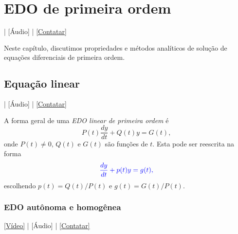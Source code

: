 

\chapter{EDO de primeira ordem}\label{cap_edo1ordem}
\thispagestyle{fancy}

\begin{flushright}
  [Vídeo] | [Áudio] | \href{https://phkonzen.github.io/notas/contato.html}{[Contatar]}
\end{flushright}

Neste capítulo, discutimos propriedades e métodos analíticos de solução de equações diferenciais de primeira ordem.

\section{Equação linear}\label{cap_edo1ordem_sec_eqlinear}

\begin{flushright}
  [Vídeo] | [Áudio] | \href{https://phkonzen.github.io/notas/contato.html}{[Contatar]}
\end{flushright}

A forma geral de uma \emph{EDO linear de primeira ordem} é
\begin{equation}
  P(t)\frac{dy}{dt} + Q(t)y = G(t),
\end{equation}
onde $P(t) \neq 0$, $Q(t)$ e $G(t)$ são funções de $t$. Esta pode ser reescrita na forma
\begin{equation}
  \color{blue}{\frac{dy}{dt} + p(t)y = g(t)},
\end{equation}
escolhendo $p(t) = Q(t)/P(t)$ e $g(t) = G(t)/P(t)$.

\subsection{EDO autônoma e homogênea}

\begin{flushright}  \href{https://archive.org/details/metodo-de-solucao-edo-ordem-1-linear-coeficientes-constantes-homogenea_20200421}{[Vídeo]} | [Áudio] | \href{https://phkonzen.github.io/notas/contato.html}{[Contatar]}
\end{flushright}

